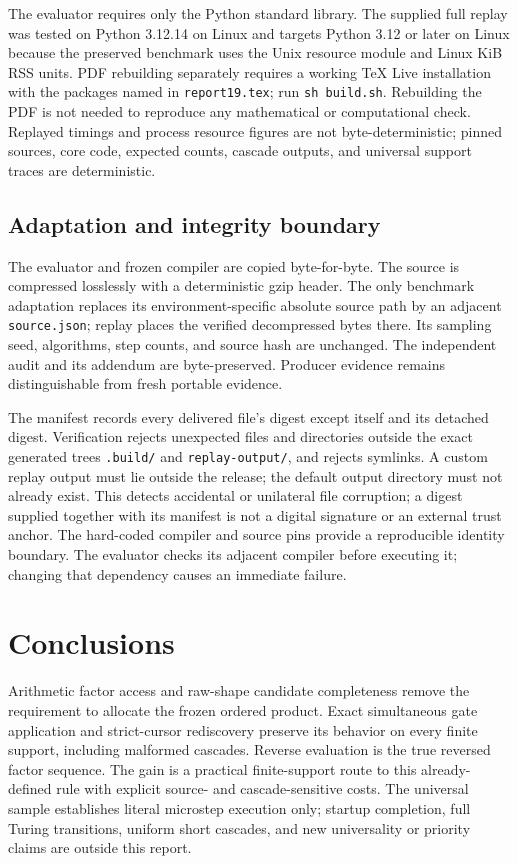 \documentclass[11pt,a4paper]{article}
\numberwithin{equation}{section}
\begin{document}
The evaluator requires only the Python standard library. The supplied full replay was tested on Python 3.12.14 on Linux and targets Python 3.12 or later on Linux because the preserved benchmark uses the Unix resource module and Linux KiB RSS units. PDF rebuilding separately requires a working TeX Live installation with the packages named in \texttt{report19.tex}; run \texttt{sh build.sh}. Rebuilding the PDF is not needed to reproduce any mathematical or computational check. Replayed timings and process resource figures are not byte-deterministic; pinned sources, core code, expected counts, cascade outputs, and universal support traces are deterministic.

\subsection{Adaptation and integrity boundary}
The evaluator and frozen compiler are copied byte-for-byte. The source is compressed losslessly with a deterministic gzip header. The only benchmark adaptation replaces its environment-specific absolute source path by an adjacent \texttt{source.json}; replay places the verified decompressed bytes there. Its sampling seed, algorithms, step counts, and source hash are unchanged. The independent audit and its addendum are byte-preserved. Producer evidence remains distinguishable from fresh portable evidence.

The manifest records every delivered file's digest except itself and its detached digest. Verification rejects unexpected files and directories outside the exact generated trees \texttt{.build/} and \texttt{replay-output/}, and rejects symlinks. A custom replay output must lie outside the release; the default output directory must not already exist. This detects accidental or unilateral file corruption; a digest supplied together with its manifest is not a digital signature or an external trust anchor. The hard-coded compiler and source pins provide a reproducible identity boundary. The evaluator checks its adjacent compiler before executing it; changing that dependency causes an immediate failure.

\section{Conclusions}
Arithmetic factor access and raw-shape candidate completeness remove the requirement to allocate the frozen ordered product. Exact simultaneous gate application and strict-cursor rediscovery preserve its behavior on every finite support, including malformed cascades. Reverse evaluation is the true reversed factor sequence. The gain is a practical finite-support route to this already-defined rule with explicit source- and cascade-sensitive costs. The universal sample establishes literal microstep execution only; startup completion, full Turing transitions, uniform short cascades, and new universality or priority claims are outside this report.
\end{document}
